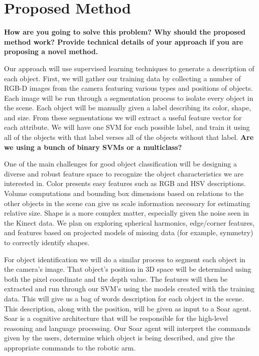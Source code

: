 \documentclass[11pt]{article}
\newcommand{\xxx}[1]{{\bf \color{red} #1}}
\newcommand{\meh}[1]{{\bf \color{blue} #1}}
\begin{document}
\section{Proposed Method}
\xxx{How are you going to solve this problem? Why should the proposed method
    work? Provide technical details of your approach if you are proposing a
    novel method.}

Our approach will use supervised learning techniques to generate a description of each object. First, we will gather our training data by collecting a number of RGB-D images from the camera featuring various types and positions of objects. Each image will be run through a segmentation process to isolate every object in the scene. Each object will be manually given a label describing its color, shape, and size. From these segmentations we will extract a useful feature vector for each attribute. We will have one SVM for each possible label, and train it using all of the objects with that label verses all of the objects without that label. \meh{Are we using a bunch of binary SVMs or a multiclass?}

One of the main challenges for good object classification will be designing a
diverse and robust feature space to recognize the object characteristics we
are interested in. Color presents easy features such as RGB and HSV
descriptions. Volume computations and bounding box dimensions based on
relations to the other objects in the scene can give us scale information
necessary for estimating relative size. Shape is a more complex matter,
especially given the noise seen in the Kinect data. We plan on exploring
spherical harmonics, edge/corner features, and features based on projected
models of missing data (for example, symmetry) to correctly identify shapes.

For object identification we will do a similar process to segment each object in the camera's image. That object's position in 3D space will be determined using both the pixel coordinate and the depth value. The features will then be extracted and run through our SVM's using the models created with the training data. This will give us a bag of words description for each object in the scene. This description, along with the position, will be given as input to a Soar agent. Soar is a cognitive architecture that will be responsible for the high-level reasoning and language processing. Our Soar agent will interpret the commands given by the users, determine which object is being described, and give the appropriate commands to the robotic arm.
\end{document}
